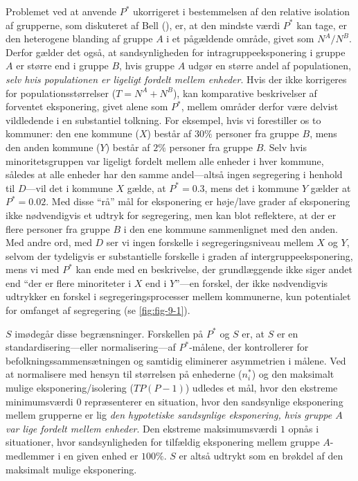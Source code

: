 \documentclass[
]{book}
\begin{document}
Problemet ved at anvende \(P^{*}\) ukorrigeret i bestemmelsen af den relative isolation af grupperne, som diskuteret af Bell (), er, at den mindste værdi \(P^{*}\) kan tage, er den heterogene blanding af gruppe \(A\) i et pågældende område, givet som \(N^{A}/N^{B}\). Derfor gælder det også, at sandsynligheden for intragruppeeksponering i gruppe \(A\) er større end i gruppe \(B\), hvis gruppe \(A\) udgør en større andel af populationen, \emph{selv hvis populationen er ligeligt fordelt mellem enheder}. Hvis der ikke korrigeres for populationsstørrelser (\(T=N^{A}+N^{B}\)), kan komparative beskrivelser af forventet eksponering, givet alene som \(P^{*}\), mellem områder derfor være delvist vildledende i en substantiel tolkning. For eksempel, hvis vi forestiller os to kommuner: den ene kommune (\(X\)) består af \(30\%\) personer fra gruppe \(B\), mens den anden kommune (\(Y\)) består af \(2\%\) personer fra gruppe \(B\). Selv hvis minoritetsgruppen var ligeligt fordelt mellem alle enheder i hver kommune, således at alle enheder har den samme andel---altså ingen segregering i henhold til \(D\)---vil det i kommune \(X\) gælde, at \(P^{*}=0.3\), mens det i kommune \(Y\) gælder at \(P^{*}=0.02\). Med disse ``rå'' mål for eksponering er høje/lave grader af eksponering ikke nødvendigvis et udtryk for segregering, men kan blot reflektere, at der er flere personer fra gruppe \(B\) i den ene kommune sammenlignet med den anden. Med andre ord, med \(D\) ser vi ingen forskelle i segregeringsniveau mellem \(X\) og \(Y\), selvom der tydeligvis er substantielle forskelle i graden af intergruppeeksponering, mens vi med \(P^{*}\) kan ende med en beskrivelse, der grundlæggende ikke siger andet end ``der er flere minoriteter i \(X\) end i \(Y\)''---en forskel, der ikke nødvendigvis udtrykker en forskel i segregeringsprocesser mellem kommunerne, kun potentialet for omfanget af segregering (se \ref{fig:fig-9-1}).

\(S\) imødegår disse begrænsninger. Forskellen på \(P^{*}\) og \(S\) er, at \(S\) er en standardisering---eller normalisering---af \(P^{*}\)-målene, der kontrollerer for befolkningssammensætningen og samtidig eliminerer asymmetrien i målene. Ved at normalisere med hensyn til størrelsen på enhederne (\(n_{i}^{*}\)) og den maksimalt mulige eksponering/isolering (\(TP(P-1)\)) udledes et mål, hvor den ekstreme minimumsværdi \(0\) repræsenterer en situation, hvor den sandsynlige eksponering mellem grupperne er lig \emph{den hypotetiske sandsynlige eksponering, hvis gruppe \(A\) var lige fordelt mellem enheder}. Den ekstreme maksimumsværdi \(1\) opnås i situationer, hvor sandsynligheden for tilfældig eksponering mellem gruppe \(A\)-medlemmer i en given enhed er \(100\%\). \(S\) er altså udtrykt som en brøkdel af den maksimalt mulige eksponering.
\end{document}
